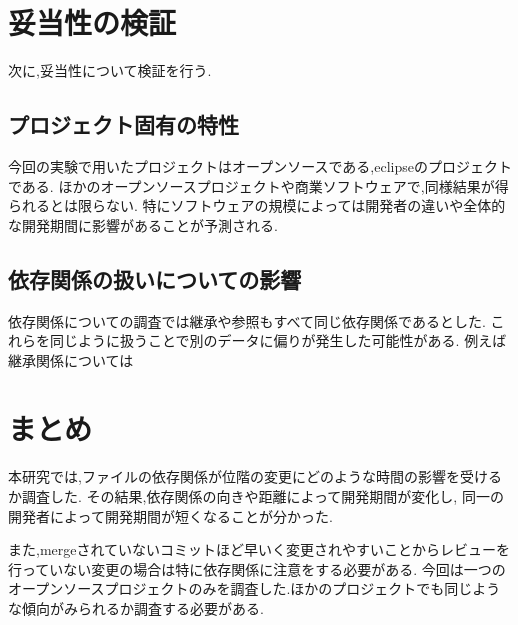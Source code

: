 \documentclass[submit,ses,noauthor]{ipsj} %
\begin{document}
\section{妥当性の検証}\label{妥当性の検証}
次に,妥当性について検証を行う.

\subsection{プロジェクト固有の特性}
今回の実験で用いたプロジェクトはオープンソースである,eclipseのプロジェクトである.
ほかのオープンソースプロジェクトや商業ソフトウェアで,同様結果が得られるとは限らない.
特にソフトウェアの規模によっては開発者の違いや全体的な開発期間に影響があることが予測される.

\subsection{依存関係の扱いについての影響}
依存関係についての調査では継承や参照もすべて同じ依存関係であるとした.
これらを同じように扱うことで別のデータに偏りが発生した可能性がある.
例えば継承関係については


\section{まとめ} \label{まとめ}
本研究では,ファイルの依存関係が位階の変更にどのような時間の影響を受けるか調査した.
その結果,依存関係の向きや距離によって開発期間が変化し,
同一の開発者によって開発期間が短くなることが分かった.

また,mergeされていないコミットほど早いく変更されやすいことからレビューを行っていない変更の場合は特に依存関係に注意をする必要がある.
今回は一つのオープンソースプロジェクトのみを調査した.ほかのプロジェクトでも同じような傾向がみられるか調査する必要がある.
\end{document}
